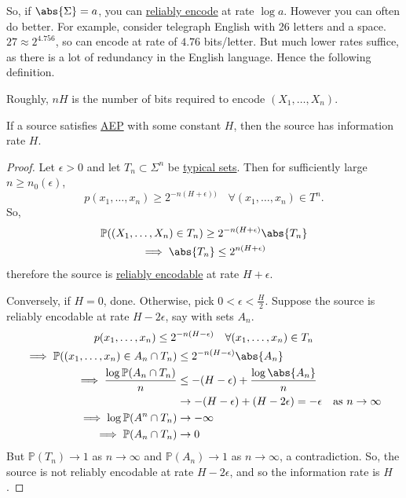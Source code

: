 \documentclass{article}
\newcommand{\Prob}{\mathbb{P}}
\newcommand{\1}[1]{\mathbbm{1}_{#1}}
\begin{document}
So, if $\abs{\Sigma}=a$, you can \hyperlink{def:reliablyEncode}{reliably encode} at rate $\log a$. However you can often do better.
For example, consider telegraph English with 26 letters and a space. $27 \approx 2^{4.756}$, so can encode at rate of $4.76$ bits/letter. But much lower rates suffice, as there is a lot of redundancy in the English language.
Hence the following definition.
Roughly, $nH$ is the number of bits required to encode $(X_1, \dotsc, X_n)$.
\begin{nthm}
    If a source satisfies \hyperlink{def:aep}{AEP} with some constant $H$, then the source has information rate $H$.
\end{nthm}
\begin{proof}Let $\epsilon > 0$ and let $T_n \subset \Sigma^n$ be \hyperlink{def:typicalSet}{typical sets}.
    Then for sufficiently large $n \geq n_0(\epsilon)$,
    \begin{equation*}
        p(x_1, \dotsc, x_n) \geq 2^{-n (H + \epsilon))} \quad \forall (x_1, \dotsc, x_n) \in T^n.
    \end{equation*}
    So,
    \begin{gather*}
        \Prob(\left(X_1, \dotsc, X_n\right) \in T_n) \geq 2^{-n(H+\epsilon)} \abs{T_n} \\
        \implies \abs{T_n} \leq 2^{n(H+\epsilon)}
    \end{gather*}
    therefore the source is \hyperlink{def:reliablyEncode}{reliably encodable} at rate $H+\epsilon$.

    Conversely, if $H=0$, done. Otherwise, pick $0 < \epsilon < \frac{H}{2}$. Suppose the source is reliably encodable at rate $H - 2 \epsilon$, say with sets $A_n$.
    \begin{gather*}
        p(x_1, \dotsc, x_n) \leq 2^{-n(H-\epsilon)} \quad \forall (x_1, \dotsc, x_n) \in T_n \\
        \begin{aligned}
            \implies \Prob((x_1, \dotsc, x_n) \in A_n \cap T_n) &\leq 2^{-n (H-\epsilon)} \abs{A_n} \\
            \implies \frac{\log \Prob(A_n \cap T_n)}{n} &\leq -(H-\epsilon) + \frac{\log \abs{A_n}}{n} \\
                                                    &\to -(H-\epsilon) + (H-2 \epsilon) = -\epsilon \quad \text{as } n \to \infty \\
            \implies \log \Prob(A^n \cap T_n) &\to -\infty \\
            \implies \Prob(A_n \cap T_n) &\to 0
        \end{aligned}
    \end{gather*}
    But $\Prob(T_n) \to 1$ as $n \to \infty$ and $\Prob(A_n) \to 1$ as $n \to \infty$, a contradiction.
    So, the source is not reliably encodable at rate $H-2\epsilon$, and so the information rate is $H$.
\end{proof}
\end{document}
